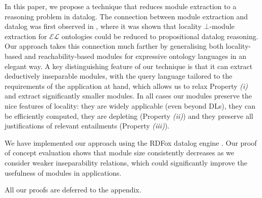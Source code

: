  
In this paper,   
we propose
a technique that reduces module 
extraction to a reasoning problem in datalog.
The connection between module extraction and datalog 
was first observed in \cite{DBLP:conf/esws/Suntisrivaraporn08}, where it was shown that 
locality $\bot$-module extraction for $\mathcal{EL}$ ontologies 
could be reduced to propositional datalog
reasoning.
Our approach takes this connection much farther by
generalising both locality-based and
reachability-based \cite{DBLP:conf/lpar/NortjeBM13} modules
for expressive ontology languages in an elegant way.
A key 
distinguishing feature of our technique is that it
can extract deductively inseparable modules, with the
query language tailored to the requirements of the
application at hand, 
which allows
us to relax Property \emph{(i)} and extract
significantly smaller modules. In all cases our modules preserve
the nice features of locality: they are
widely applicable (even beyond DLs), they
can be efficiently computed,  
they
are depleting  (Property \emph{(ii)}) and they
 preserve all justifications of relevant entailments
(Property \emph{(iii)}). 

We have implemented our approach
using the RDFox datalog engine \cite{DBLP:conf/aaai/MotikNPHO14}. 
Our proof of concept
evaluation shows that
module size consistently decreases as we consider weaker inseparability
relations, which could significantly improve the usefulness of modules in applications.

All our proofs are deferred to the appendix.
